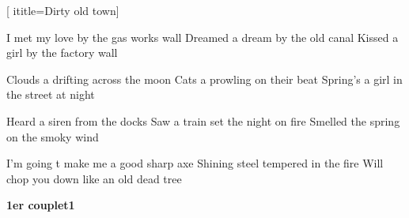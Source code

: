  [
ititle={Dirty old town}]

\beginverse
I met my love by the gas works wall
Dreamed a dream by the old canal
Kissed a girl by the factory wall
\endverse

\beginverse
Clouds a drifting across the moon
Cats a prowling on their beat
Spring's a girl in the street at night
\endverse

\beginverse
Heard a siren from the docks
Saw a train set the night on fire
Smelled the spring on the smoky wind
\endverse

\beginverse
I'm going t make me a good sharp axe
Shining steel tempered in the fire
Will chop you down like an old dead tree
\endverse

\beginverse
\textbf{1er couplet1}
\endverse
\endsong